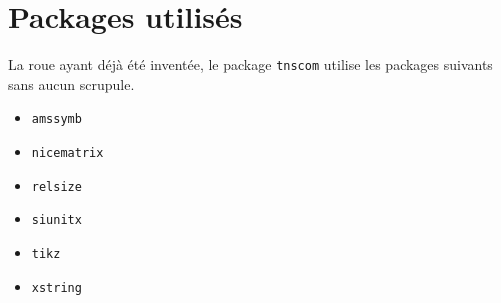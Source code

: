 \documentclass[12pt,a4paper]{article}
\begin{document}
\section{Packages utilisés}

La roue ayant déjà été inventée, le package \verb#tnscom# utilise les packages suivants sans aucun scrupule.

\begin{multicols}{4}
    \begin{itemize}
\item \verb#amssymb#
    \item \verb#nicematrix#
    \item \verb#relsize#
    \item \verb#siunitx#
    \item \verb#tikz#
    \item \verb#xstring#
    \end{itemize}
\end{multicols}
\end{document}
